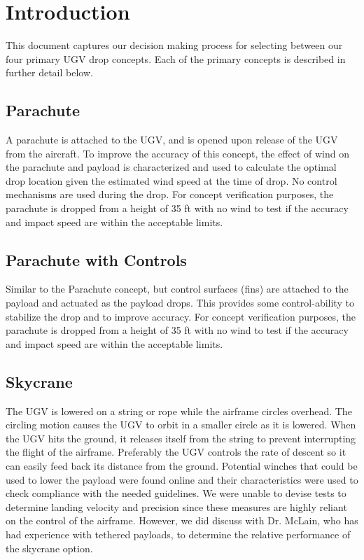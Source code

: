 \documentclass[]{auvsi_doc}
\begin{document}
\begin{AUVSITitlePage}
\begin{artifacttable}
\end{artifacttable}
\end{AUVSITitlePage}


\section{Introduction}
This document captures our decision making process for selecting between our four primary UGV drop concepts.
Each of the primary concepts is described in further detail below. 

\subsection{Parachute}
A parachute is attached to the UGV, and is opened upon release of the UGV from the aircraft. To improve the accuracy of this concept, the effect of wind on the parachute and payload is characterized and used to calculate the optimal drop location given the estimated wind speed at the time of drop. No control mechanisms are used during the drop. For concept verification purposes, the parachute is dropped from a height of 35 ft with no wind to test  if the accuracy and impact speed are within the acceptable limits.

\subsection{Parachute with Controls}
Similar to the Parachute concept, but control surfaces (fins) are attached to the payload and actuated as the payload drops. This provides some control-ability to stabilize the drop and to improve accuracy. For concept verification purposes, the parachute is dropped from a height of 35 ft with no wind to test  if the accuracy and impact speed are within the acceptable limits.

\subsection{Skycrane}
The UGV is lowered on a string or rope while the airframe circles overhead. The circling motion causes the UGV to orbit in a smaller circle as it is lowered. When the UGV hits the ground, it releases itself from the string to prevent interrupting the flight of the airframe. Preferably the UGV controls the rate of descent so it can easily feed back its distance from the ground. Potential winches that could be used to lower the payload were found online and their characteristics were used to check compliance with the needed guidelines. We were unable to devise tests to determine landing velocity and precision since these measures are highly reliant on the control of the airframe. However, we did discuss with Dr. McLain, who has had experience with tethered payloads, to determine the relative performance of the skycrane option.
\end{document}
